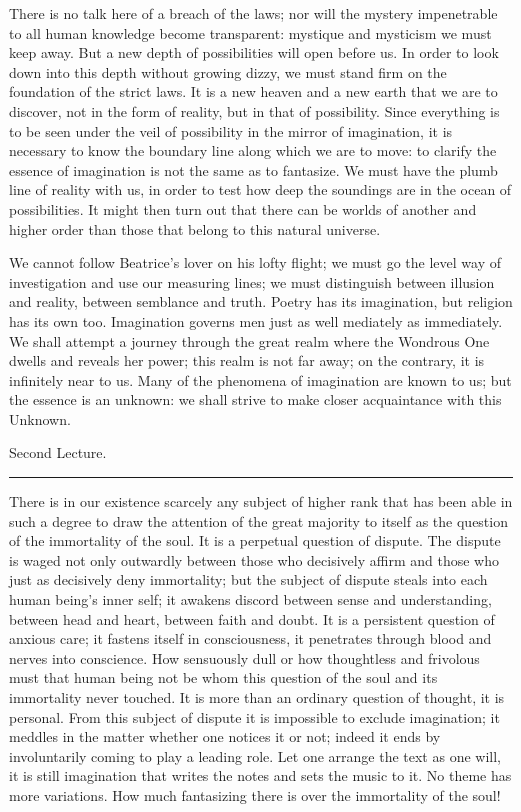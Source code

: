 \documentclass[12pt,a4paper,openany]{book}
\newcommand{\opage}[1]{\marginnote{\footnotesize\textit{[#1]}}}
\newcommand{\lecture}[1]{\clearpage\begin{center}{\large #1}\\[0.4em]\rule{3em}{0.4pt}\end{center}\medskip\noindent}
\begin{document}
There is no talk here of a breach of the laws; nor will the mystery impenetrable to all human knowledge become
transparent: mystique and mysticism we must keep away. But a new depth of possibilities will open before us. In order
to look down into this depth without growing dizzy, we must stand firm on the foundation of the strict laws. It is a
new heaven and a new earth that we are to discover, not in the form of reality, but in that of possibility. Since
everything is to be seen under the veil of possibility in the mirror of imagination, it is necessary to know the
boundary line along which we are to move: to clarify the essence of imagination is not the same as to fantasize. We
must have the plumb line of reality with us, in order to test how deep the soundings are in the ocean of
possibilities. It might then turn out that there can be worlds of another and higher order than those that belong to
this natural universe.

We cannot follow Beatrice's lover on his lofty flight; we must go the level way of investigation and use our measuring
lines; we must distinguish between illusion and reality, between semblance and truth. Poetry has
\setcounter{footnote}{0}%
\opage{13}its imagination, but religion has its own too. Imagination governs men just as well mediately as immediately.
We shall attempt a journey through the great realm where the Wondrous One dwells and reveals her power; this realm is
not far away; on the contrary, it is infinitely near to us. Many of the phenomena of imagination are known to us; but
the essence is an unknown: we shall strive to make closer acquaintance with this Unknown.

\setcounter{footnote}{0}%
\lecture{Second Lecture.}\opage{14}

There is in our existence scarcely any subject of higher rank that has been able in such a degree to draw the
attention of the great majority to itself as the question of the immortality of the soul. It is a perpetual question
of dispute. The dispute is waged not only outwardly between those who decisively affirm and those who just as
decisively deny immortality; but the subject of dispute steals into each human being's inner self; it awakens discord
between sense and understanding, between head and heart, between faith and doubt. It is a persistent question of
anxious care; it fastens itself in consciousness, it penetrates through blood and nerves into conscience. How
sensuously dull or how thoughtless and frivolous must that human being not be whom this question of the soul and its
immortality never touched. It is more than an ordinary question of thought, %
it is personal. From this subject of dispute it is impossible to exclude imagination; it meddles in the matter whether
one notices it or not; indeed it ends by involuntarily coming to play a leading role. Let one arrange the text as one
will, it is still imagination that writes the notes and sets the music %
\setcounter{footnote}{0}%
\opage{15}to it. No theme has more variations. How much fantasizing there is over the immortality of the soul!
\end{document}
